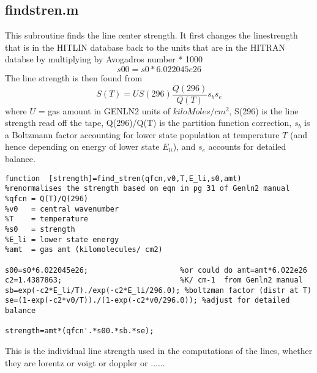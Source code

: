 \documentclass[11pt]{article}
\begin{document}
\subsection{findstren.m}

This subroutine finds the line center strength. It first changes the 
linestrength that is in the HITLIN database back to the units that are
in the HITRAN databse by multiplying by Avogadros number * 1000 
\begin{displaymath}
  s00=s0*6.022045e26
\end{displaymath}
The line strength is then found from 
\begin{displaymath}
S(T) = U S(296) \frac{Q(296)}{Q(T)} s_{b} s_{e}
\end{displaymath}
where $U$ = gas amount in GENLN2 units of $kiloMoles/cm^{2}$, S(296) is the 
line strength read off the tape, Q(296)/Q(T) is the partition function 
correction, $s_{b}$ is a Boltzmann factor accounting for lower state 
population at 
temperature $T$ (and hence depending on energy of lower state $E_{li}$), and
$s_{e}$ accounts for detailed balance.

\begin{verbatim}
function  [strength]=find_stren(qfcn,v0,T,E_li,s0,amt)
%renormalises the strength based on eqn in pg 31 of Genln2 manual
%qfcn = Q(T)/Q(296)
%v0   = central wavenumber
%T    = temperature
%s0   = strength
%E_li = lower state energy
%amt  = gas amt (kilomolecules/ cm2)

s00=s0*6.022045e26;                     %or could do amt=amt*6.022e26
c2=1.4387863;                           %K/ cm-1  from Genln2 manual
sb=exp(-c2*E_li/T)./exp(-c2*E_li/296.0); %boltzman factor (distr at T)
se=(1-exp(-c2*v0/T))./(1-exp(-c2*v0/296.0)); %adjust for detailed balance

strength=amt*(qfcn'.*s00.*sb.*se);
\end{verbatim}

This is the individual line strength used in the computations of the lines,
whether they are lorentz or voigt or doppler or ......


%

\end{document}

